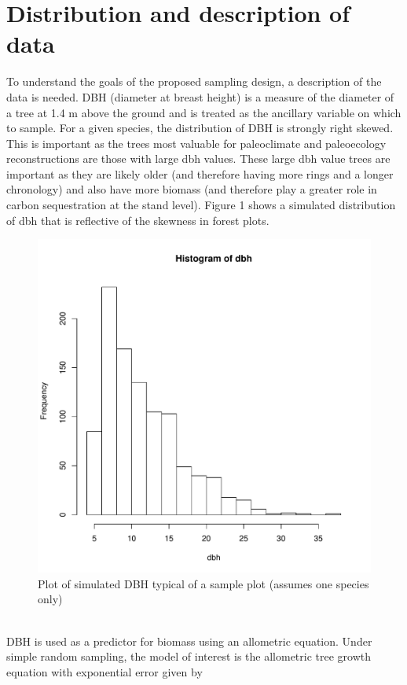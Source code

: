 \documentclass[fleqn]{article}
\begin{document}
\section{Distribution and description of data}
  To understand the goals of the proposed sampling design, a description of the data is needed. DBH (diameter at breast height) is a measure of the diameter of a tree at 1.4 m above the ground and is treated as the ancillary variable on which to sample. For a given species, the distribution of DBH is strongly right skewed. This is important as the trees most valuable for paleoclimate and paleoecology reconstructions are those with large dbh values. These large dbh value trees are important as they are likely  older (and therefore having more rings and a longer chronology) and also have more biomass (and therefore play a greater role in carbon sequestration at the stand level). Figure 1 shows a simulated distribution of dbh that is reflective of the skewness in forest plots.\\
  \begin{figure}
    \centering
    \caption{Plot of simulated DBH typical of a sample plot (assumes one species only)}
    \includegraphics[scale = 0.5]{dbh1}
  \end{figure}
\\
  DBH is used as a predictor for biomass using an allometric equation.   Under simple random sampling, the model of interest is the allometric tree growth equation with exponential error given by 
\end{document}
